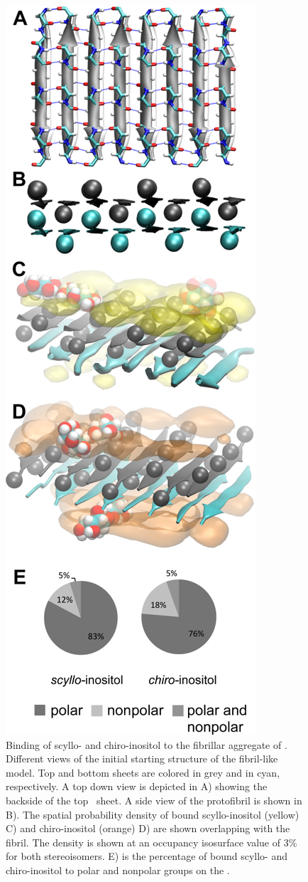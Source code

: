 \begin{figure}[htbp]
  \centering
  \includegraphics[scale=0.75]{figures/results1/GA4_paper_figures_submitted-6}
  \caption[Binding of scyllo- and chiro-inositol to the fibrillar aggregate of \gafour.]{Binding of scyllo- and chiro-inositol to the fibrillar aggregate of \gafour. Different views of the initial starting structure of the fibril-like model. Top and bottom sheets are colored in grey and in cyan, respectively. A top down view is depicted in A) showing the backside of the top \gafour\ sheet. A side view of the protofibril is shown in B). The spatial probability density of bound scyllo-inositol (yellow) C) and chiro-inositol (orange) D) are shown overlapping with the fibril. The density is shown at an occupancy isosurface value of 3\% for both stereoisomers. E) is the percentage of bound scyllo- and chiro-inositol to polar and nonpolar groups on the \bsheet.}

\end{figure}
